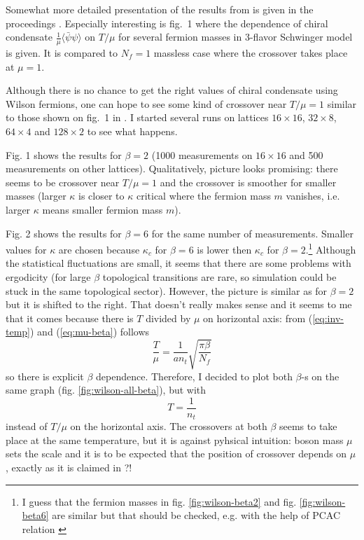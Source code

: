 \documentclass[12pt,a4paper]{article}
\begin{document}
Somewhat more detailed presentation of the results from \cite{Hetrick:1995yx} is given in the proceedings \cite{Hosotani:1995gn}. Especially interesting is fig.~1 where the dependence of chiral condensate $\frac{1}{\mu}\langle\bar{\psi}\psi\rangle$ on $T/\mu$ for several fermion masses in 3-flavor Schwinger model is given. It is compared to $N_{\!f} = 1$ massless case \cite{Sachs:1991en} where the crossover takes place at $\mu = 1$.

Although there is no chance to get the right values of chiral condensate using Wilson fermions, one can hope to see some kind of crossover near $T/\mu = 1$ similar to those shown on fig.~1 in \cite{Hosotani:1995gn}. I started several runs on lattices $16 \times 16$, $32 \times 8$, $64 \times 4$ and $128 \times 2$ to see what happens.

Fig. 1 shows the results for $\beta = 2$ (1000 measurements on $16 \times 16$ and 500 measurements on other lattices). Qualitatively, picture looks promising: there seems to be crossover near $T/\mu = 1$ and the crossover is smoother for smaller masses (larger $\kappa$ is closer to $\kappa$ critical where the fermion mass $m$ vanishes, i.e. larger $\kappa$ means smaller fermion mass $m$).

Fig. 2 shows the results for $\beta =6$ for the same number of measurements. Smaller values for $\kappa$ are chosen because $\kappa_c$ for $\beta = 6$ is lower then $\kappa_c$ for $\beta = 2$.\footnote{I guess that the fermion masses in fig. \ref{fig:wilson-beta2} and fig. \ref{fig:wilson-beta6} are similar but that should be checked, e.g. with the help of PCAC relation \cite{Hip:1997em,Gattringer:1999gt}} Although the statistical fluctuations are small, it seems that there are some problems with ergodicity (for large $\beta$ topological transitions are rare, so simulation could be stuck in the same topological sector). However, the picture is similar as for $\beta = 2$ but it is shifted to the right. That doesn't really makes sense and it seems to me that it comes because there is $T$ divided by $\mu$ on horizontal axis: from (\ref{eq:inv-temp}) and (\ref{eq:mu-beta}) follows
\begin{equation}
  \frac{T}{\mu} = \frac{1}{a n_t} \sqrt{\frac{\pi \beta}{N_{\!f}}} 
\end{equation}
so there is explicit $\beta$ dependence. Therefore, I decided to plot both $\beta$-s on the same graph (fig. \ref{fig:wilson-all-beta}), but with
\begin{equation}
  T = \frac{1}{n_t}
\end{equation}
instead of $T/\mu$ on the horizontal axis. The crossovers at both $\beta$ seems to take place at the same temperature, but it is against pyhsical intuition: boson mass $\mu$ sets the scale and it is to be expected that the position of crossover depends on $\mu$, exactly as it is claimed in \cite{Hetrick:1995yx,Hosotani:1995gn}?!
\end{document}
